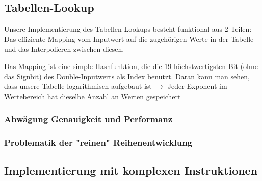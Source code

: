 \documentclass[course=erap] {aspdoc}
\begin{document}
    \subsection{Tabellen-Lookup}
    Unsere Implementierung des Tabellen-Lookups besteht funktional aus 2 Teilen: Das effiziente Mapping vom Inputwert auf
    die zugehörigen Werte in der Tabelle und das Interpolieren zwischen diesen.
    
    Das Mapping ist eine simple Hashfunktion, die die 19 höchstwertigsten Bit (ohne das Signbit) des Double-Inputwerts als Index benutzt. Daran kann man sehen, dass
    unsere Tabelle logarithmisch aufgebaut ist $\rightarrow$ Jeder Exponent im Wertebereich hat dieselbe Anzahl an Werten gespeichert
    \subsubsection{Abwägung Genauigkeit und Performanz}
    \subsubsection{Problematik der "reinen" Reihenentwicklung}
    


    

    \subsection{Implementierung mit komplexen Instruktionen}
    
\end{document}
